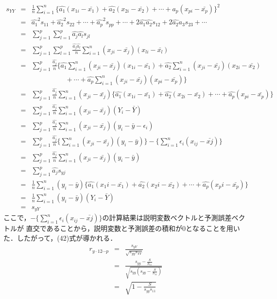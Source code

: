 \documentclass[dvipdfmx]{jsarticle}
\begin{document}
\begin{eqnarray}
  s_{YY}&=&\frac{1}{n}\sum_{i=1}^n \{\hat{a_1}(x_{1i}-\bar{x_1})+\hat{a_2}(x_{2i}-\bar{x_2})+\cdots +\hat{a_p}(x_{pi}-\bar{x_p})\}^2
  \nonumber \\
  &=&\hat{a_1}^2s_{11}+\hat{a_2}^2s_{22}+\cdots+\hat{a_p}^2s_{pp}+\cdots+2\hat{a_1}\hat{a_2}s_{12}+2\hat{a_2}{a_3}s_{23}+\cdots \nonumber \\
  &=&\sum_{j=1}^p\sum_{l=1}^p\hat{a_j}\hat{a_l}s_{jl} \nonumber \\
  &=&\sum_{j=1}^p\sum_{l=1}^p\frac{\hat{a_j}\hat{a_l}}{n}\sum_{i=1}^n(x_{ji}-\bar{x_j})(x_{li}-\bar{x_l}) \nonumber \\
  &=&\sum_{j=1}^p\frac{\hat{a_j}}{n}\{\hat{a_1}\sum_{i=1}^n (x_{ji}-\bar{x_j})(x_{1i}-\bar{x_1})+\hat{a_2}\sum_{i=1}^n (x_{ji}-\bar{x_j})(x_{2i}-\bar{x_2}) \nonumber \\
  && \; \; \; \; \; \; \; \; \; \; \; \; \; \; \; \; \; \;+ \cdots+\hat{a_p}\sum_{i=1}^n (x_{ji}-\bar{x_j})(x_{pi}-\bar{x_p})\} \nonumber \\
  &=&\sum_{j=1}^p\frac{\hat{a_j}}{n}\sum_{i=1}^n(x_{ji}-\bar{x_j})\{\hat{a_1}(x_{1i}-\bar{x_1})+\hat{a_2}(x_{2i}-\bar{x_2})+\cdots+\hat{a_p}(x_{pi}-\bar{x_p})\} \nonumber \\
  &=&\sum_{j=1}^p\frac{\hat{a_j}}{n}\sum_{i=1}^n(x_{ji}-\bar{x_j})(Y_{i}-\bar{Y}) \nonumber \\
  &=&\sum_{j=1}^p\frac{\hat{a_j}}{n}\sum_{i=1}^n(x_{ji}-\bar{x_j})(y_{i}-\bar{y}-\epsilon_i) \nonumber \\
  &=&\sum_{j=1}^p\frac{\hat{a_j}}{n}\{\sum_{i=1}^n(x_{ji}-\bar{x_j})(y_{i}-\bar{y})\}-\{\sum_{i=1}^n \epsilon_i(x_{ij}-\bar{xj})\} \nonumber \\
  &=&\sum_{j=1}^p\frac{\hat{a_j}}{n}\sum_{i=1}^n(x_{ji}-\bar{x_j})(y_{i}-\bar{y}) \nonumber \\
  &=&\sum_{j=1}^p\hat{a_j}s_{yj} \nonumber \\
  &=&\frac{1}{n}\sum_{i=1}^n (y_i-\bar{y})\{\hat{a_1}(x_1i-\bar{x_1})+\hat{a_2}(x_2i-\bar{x_2})+\cdots+\hat{a_p}(x_pi-\bar{x_p})\} \nonumber \\
  &=&\frac{1}{n}\sum_{i=1}^n (y_i-\bar{y})(Y_i-\bar{Y}) \nonumber \\
  &=&s_{yY}
\end{eqnarray}
ここで，$\displaystyle -\{\sum_{i=1}^n \epsilon_i(x_{ij}-\bar{xj})\}$の計算結果は説明変数ベクトルと予測誤差ベクトルが
直交であることから，説明変数と予測誤差の積和が$0$となることを用いた．したがって，(42)式が導かれる．
\begin{eqnarray}
  r_{y\cdot12\cdots p} &=& \frac{s_{yY}}{\sqrt{s_{yy}s_{YY}}} \nonumber \\
  &=&\frac{s_{yy}-\frac{S}{S_{11}}}{\sqrt{s_{yy}\left(s_{yy}-\frac{S}{S_{11}}\right)}} \nonumber \\
  &=&\sqrt{1-\frac{S}{s_{yy}s_{11}}}
\end{eqnarray}
\end{document}
